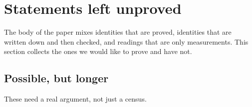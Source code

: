 \documentclass[11pt]{article}
\theoremstyle{definition}
\begin{document}
\clearpage

\section{Statements left unproved}\label{sec:unproved}

The body of the paper mixes identities that are proved, identities that
are written down and then checked, and readings that are only
measurements. This section collects the ones we would like to prove and
have not.

\subsection*{Possible, but longer}

These need a real argument, not just a census.
\end{document}
